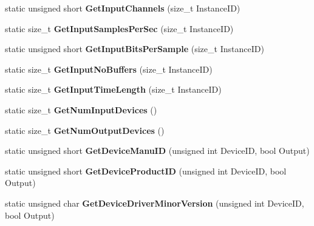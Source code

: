 \begin{DoxyCompactItemize}
\item 
\hypertarget{structmn_c_l_r_aec9b4e533a9b6975e378aadbed39a52d}{
static unsigned short {\bfseries GetInputChannels} (size\_\-t InstanceID)}
\label{structmn_c_l_r_aec9b4e533a9b6975e378aadbed39a52d}

\item 
\hypertarget{structmn_c_l_r_a38a4c2da6afe1a15655fd2f71298a5ed}{
static size\_\-t {\bfseries GetInputSamplesPerSec} (size\_\-t InstanceID)}
\label{structmn_c_l_r_a38a4c2da6afe1a15655fd2f71298a5ed}

\item 
\hypertarget{structmn_c_l_r_aa866ae94734065781d249126c90286e7}{
static unsigned short {\bfseries GetInputBitsPerSample} (size\_\-t InstanceID)}
\label{structmn_c_l_r_aa866ae94734065781d249126c90286e7}

\item 
\hypertarget{structmn_c_l_r_af92c616d3fd3f47aa6583268877bbcc6}{
static size\_\-t {\bfseries GetInputNoBuffers} (size\_\-t InstanceID)}
\label{structmn_c_l_r_af92c616d3fd3f47aa6583268877bbcc6}

\item 
\hypertarget{structmn_c_l_r_a3ee2b2d32e97d4fe92615cb908066eb6}{
static size\_\-t {\bfseries GetInputTimeLength} (size\_\-t InstanceID)}
\label{structmn_c_l_r_a3ee2b2d32e97d4fe92615cb908066eb6}

\item 
\hypertarget{structmn_c_l_r_a0b9f7fc541045b812a17d3f1a74c3db0}{
static size\_\-t {\bfseries GetNumInputDevices} ()}
\label{structmn_c_l_r_a0b9f7fc541045b812a17d3f1a74c3db0}

\item 
\hypertarget{structmn_c_l_r_aa23af7f2e94d98ce372bc87a4b54a0f3}{
static size\_\-t {\bfseries GetNumOutputDevices} ()}
\label{structmn_c_l_r_aa23af7f2e94d98ce372bc87a4b54a0f3}

\item 
\hypertarget{structmn_c_l_r_a88c39da6f2e4424fbaa355b8dba48dd8}{
static unsigned short {\bfseries GetDeviceManuID} (unsigned int DeviceID, bool Output)}
\label{structmn_c_l_r_a88c39da6f2e4424fbaa355b8dba48dd8}

\item 
\hypertarget{structmn_c_l_r_afe4a1d0467638ee8fafc1089bac43122}{
static unsigned short {\bfseries GetDeviceProductID} (unsigned int DeviceID, bool Output)}
\label{structmn_c_l_r_afe4a1d0467638ee8fafc1089bac43122}

\item 
\hypertarget{structmn_c_l_r_a63810178ece4fbf6ed0596e0a2a6cf06}{
static unsigned char {\bfseries GetDeviceDriverMinorVersion} (unsigned int DeviceID, bool Output)}
\label{structmn_c_l_r_a63810178ece4fbf6ed0596e0a2a6cf06}


\end{DoxyCompactItemize}
